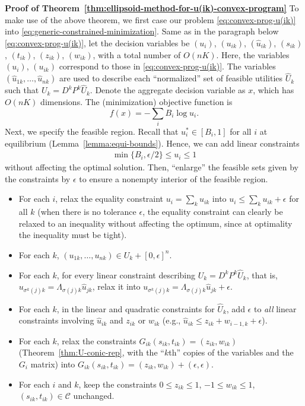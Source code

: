 \smallskip\noindent\textbf{Proof of Theorem~\ref{thm:ellipsoid-method-for-u(ik)-convex-program}}
To make use of the above theorem, we first case our problem \eqref{eq:convex-prog-u(ik)} into \eqref{eq:generic-constrained-minimization}. Same as in the paragraph below \eqref{eq:convex-prog-u(ik)}, 
let the decision variables be $(u_i)$, $(u_{ik})$, $(\hat{u}_{ik})$, $(s_{ik})$, $(t_{ik})$, $(z_{ik})$, $(w_{ik})$, with a total number of $O(nK)$. 
Here, the variables $(u_i)$, $(u_{ik})$ correspond to those in \eqref{eq:convex-prog-u(ik)}. 
The variables $(\hat{u}_{1k}, \dots, \hat{u}_{nk})$ are used to describe each ``normalized'' set of feasible utilities $\hat{U}_k$ such that $U_k = D^k P^k \hat{U}_k$.
Denote the aggregate decision variable as $x$, which has $O(nK)$ dimensions. The (minimization) objective function is 
\[ f(x) = - \sum_i B_i \log u_i.\] 
Next, we specify the feasible region. 
Recall that $u^*_i \in [B_i, 1]$ for all $i$ at equilibrium (Lemma~\ref{lemma:equi-bounds}). 
Hence, we can add linear constraints 
\begin{align}
	\min\{B_i, \epsilon/2\} \leq u_i \leq 1
	\label{eq:ellipsoid-complexity-proof-u_i-bounds}
\end{align}
without affecting the optimal solution. 
Then, ``enlarge'' the feasible sets given by the constraints by $\epsilon$ to ensure a nonempty interior of the feasible region.
\begin{itemize}
	\item For each $i$, relax the equality constraint $u_i = \sum_k u_{ik}$ into $u_i \leq \sum_k u_{ik} + \epsilon$ for all $k$ (when there is no tolerance $\epsilon$, the equality constraint can clearly be relaxed to an inequality without affecting the optimum, since at optimality the inequality must be tight).
	\item For each $k$, $(u_{1k}, \dots, u_{nk})\in U_k + [0,\epsilon]^n$.
	\item For each $k$, for every linear constraint describing $U_k = D^k P^k \hat{U}_k$, that is, $u_{\sigma^k(j)k} = \Lambda_{\sigma(j) k} \hat{u}_{jk}$, relax it into $u_{\sigma^k(j)k} = \Lambda_{\sigma(j) k} \hat{u}_{jk} + \epsilon$.
	\item For each $k$, in the linear and quadratic constraints for $\hat{U}_k$, add $\epsilon$ to \emph{all} linear constraints involving $\hat{u}_{ik}$ and $z_{ik}$ or $w_{ik}$ (e.g., $\hat{u}_{ik} \leq z_{ik} + w_{i-1,k} + \epsilon$).
	\item For each $k$, relax the constraints $G_{ik} (s_{ik}, t_{ik}) = (z_{ik}, w_{ik})$ (Theorem~\ref{thm:U-conic-rep}, with the ``$k$th'' copies of the variables and the $G_i$ matrix) into $G_{ik} (s_{ik}, t_{ik}) = (z_{ik}, w_{ik}) + (\epsilon, \epsilon)$.
	\item For each $i$ and $k$, keep the constraints $0\leq z_{ik}\leq 1$, $-1\leq w_{ik}\leq 1$, $(s_{ik}, t_{ik})\in\mathcal{C}$ unchanged.
\end{itemize}
